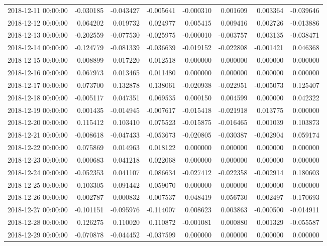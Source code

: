 \begin{tabular}{lrrrrrrr}
2018-12-11 00:00:00 & -0.030185 & -0.043427 & -0.005641 & -0.000310 & 0.001609 & 0.003364 & -0.039646 \\
2018-12-12 00:00:00 & 0.064202 & 0.019732 & 0.024977 & 0.005415 & 0.009416 & 0.002726 & -0.013886 \\
2018-12-13 00:00:00 & -0.202559 & -0.077530 & -0.025975 & -0.000010 & -0.003757 & 0.003135 & -0.038471 \\
2018-12-14 00:00:00 & -0.124779 & -0.081339 & -0.036639 & -0.019152 & -0.022808 & -0.001421 & 0.046368 \\
2018-12-15 00:00:00 & -0.008899 & -0.017220 & -0.012518 & 0.000000 & 0.000000 & 0.000000 & 0.000000 \\
2018-12-16 00:00:00 & 0.067973 & 0.013465 & 0.011480 & 0.000000 & 0.000000 & 0.000000 & 0.000000 \\
2018-12-17 00:00:00 & 0.073700 & 0.132878 & 0.138061 & -0.020938 & -0.022951 & -0.005073 & 0.125407 \\
2018-12-18 00:00:00 & -0.005117 & 0.047351 & 0.069535 & 0.000150 & 0.004599 & 0.000000 & 0.042322 \\
2018-12-19 00:00:00 & 0.001435 & -0.014945 & -0.007617 & -0.015418 & -0.021918 & 0.013775 & 0.000000 \\
2018-12-20 00:00:00 & 0.115412 & 0.103410 & 0.075523 & -0.015875 & -0.016465 & 0.001039 & 0.103873 \\
2018-12-21 00:00:00 & -0.008618 & -0.047433 & -0.053673 & -0.020805 & -0.030387 & -0.002904 & 0.059174 \\
2018-12-22 00:00:00 & 0.075869 & 0.014963 & 0.018122 & 0.000000 & 0.000000 & 0.000000 & 0.000000 \\
2018-12-23 00:00:00 & 0.000683 & 0.041218 & 0.022068 & 0.000000 & 0.000000 & 0.000000 & 0.000000 \\
2018-12-24 00:00:00 & -0.052353 & 0.041107 & 0.086634 & -0.027412 & -0.022358 & -0.002914 & 0.180603 \\
2018-12-25 00:00:00 & -0.103305 & -0.091442 & -0.059070 & 0.000000 & 0.000000 & 0.000000 & 0.000000 \\
2018-12-26 00:00:00 & 0.002787 & 0.000832 & -0.007537 & 0.048419 & 0.056730 & 0.002497 & -0.170693 \\
2018-12-27 00:00:00 & -0.101151 & -0.095976 & -0.114007 & 0.008623 & 0.003863 & -0.000500 & -0.014911 \\
2018-12-28 00:00:00 & 0.126275 & 0.110020 & 0.110872 & -0.001081 & 0.000880 & 0.001329 & -0.055587 \\
2018-12-29 00:00:00 & -0.070878 & -0.044452 & -0.037599 & 0.000000 & 0.000000 & 0.000000 & 0.000000 \\

\end{tabular}
